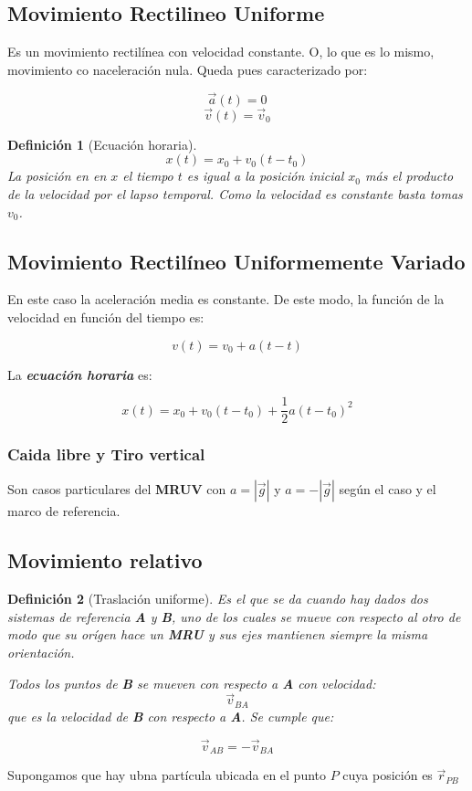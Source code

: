 \documentclass[12pt,a4paper]{article}
\newtheorem{mydef}{Definici\'on}[section]
\begin{document}
\subsection{Movimiento Rectilineo Uniforme}
Es un movimiento rectil\'inea con velocidad constante. O, lo que es lo
mismo, movimiento co naceleraci\'on nula. Queda pues caracterizado por:

\[
\vec{a}(t) = 0 \]
\[
\vec{v}(t) = \vec{v}_0 \]



\begin{mydef}[Ecuaci\'on horaria]
\[
x(t) = x_0 + v_0(t - t_0)\]
La posici\'on en en \(x\) el tiempo \(t\) es igual a la posici\'on inicial
\(x_0\) m\'as el producto de la velocidad por el lapso temporal. Como la
velocidad es constante basta tomas \(v_0\).
\end{mydef}

\subsection{Movimiento Rectil\'ineo Uniformemente Variado}
En este caso la aceleraci\'on media es constante. De este modo, la
funci\'on de la velocidad en funci\'on del tiempo es:

\[ v(t) = v_0 + a(t-t) \]

La \textbf{\textit{ecuaci\'on horaria}} es:

\[
x(t) = x_0 + v_0(t-t_0) + \frac{1}{2} a (t-t_0)^2\]

\subsubsection{Caida libre y Tiro vertical}
Son casos particulares del \textbf{MRUV} con \( a = |\vec{g}| \) y
\(a=- |\vec{g}|\) seg\'un el caso y el marco de referencia.

\subsection{Movimiento relativo}

\begin{mydef}[Traslaci\'on uniforme]
Es el que se da cuando hay dados dos sistemas de referencia
\textbf{A} y \textbf{B}, uno de los cuales se mueve con respecto al otro
 de modo que su or\'igen hace un \textbf{MRU} y sus ejes mantienen
 siempre la misma orientaci\'on.

Todos los puntos de \textbf{B} se mueven con respecto a \textbf{A} con
velocidad:
\[ \vec{v}_{BA}\]
que es la velocidad de \textbf{B} con respecto a \textbf{A}. Se cumple
que:

\[ \vec{v}_{AB} = -\vec{v}_{BA}\]
\end{mydef}

Supongamos que hay ubna partícula ubicada en el punto \(P\) cuya
posición es \(\vec{r}_{PB}\)
\end{document}
